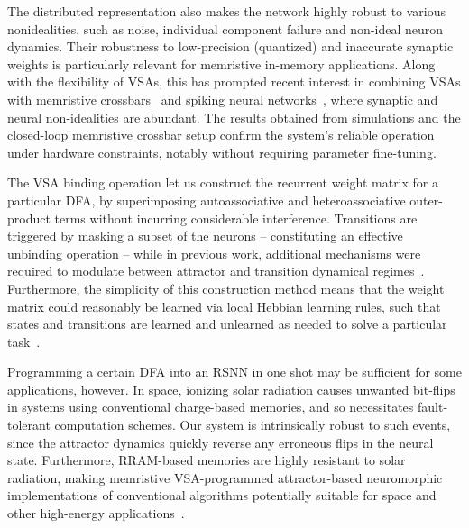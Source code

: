 The distributed representation also makes the network highly robust to various nonidealities, such as noise, individual component failure and non-ideal neuron dynamics. Their robustness to low-precision (quantized) and inaccurate synaptic weights is particularly relevant for memristive in-memory applications.
Along with the flexibility of VSAs, this has prompted recent interest in combining VSAs  with memristive crossbars~\cite{karunaratne_-memory_2020, barkam_reliable_2023} and spiking neural networks~\cite{frady_robust_2019, renner_neuromorphic_2022, zou_memory-inspired_2022, morris_hyperspike_2022}, where synaptic and neural non-idealities are abundant. 
The results obtained from simulations and the closed-loop memristive crossbar setup confirm the system's reliable operation under hardware constraints, notably without requiring parameter fine-tuning.

The VSA binding operation let us construct the recurrent weight matrix for a particular DFA, by superimposing autoassociative and heteroassociative outer-product terms without incurring considerable interference. Transitions are triggered by masking a subset of the neurons -- constituting an effective unbinding operation -- while in previous work, additional mechanisms were required to modulate between attractor and transition dynamical regimes~\cite{horn_neural_1989, sommer_synfire_2005, kambara_role_1997, gutfreund_processing_1988, amit_neural_1988, drossaers_hopfield_1992, chen_attractor-state_2020, peretto_collective_1986}.
Furthermore, the simplicity of this construction method means that the weight matrix could reasonably be learned via local Hebbian learning rules, such that states and transitions are learned and unlearned as needed to solve a particular task~\cite{osipov_associative_2017}.



Programming a certain DFA into an RSNN in one shot may be sufficient for some applications, however. In space, ionizing solar radiation causes unwanted bit-flips in systems using conventional charge-based memories, and so necessitates fault-tolerant computation schemes. Our system is intrinsically robust to such events, since the attractor dynamics quickly reverse any erroneous flips in the neural state. Furthermore, RRAM-based memories are highly resistant to solar radiation, making memristive VSA-programmed attractor-based neuromorphic implementations of conventional algorithms potentially suitable for space and other high-energy applications~\cite{maestro-izquierdo_gamma_2021}.



